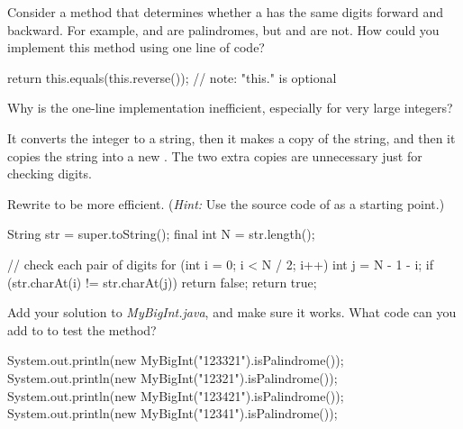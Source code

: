 \Q Consider a method  that determines whether a  has the same digits forward and backward.
For example,  and  are palindromes, but  and  are not.
How could you implement this method using one line of code?

\begin{javalst}
public boolean isPalindrome() {
\end{javalst}

\vspace{-1ex}
\begin{answer}[1em]
\begin{javaans}
    return this.equals(this.reverse());  // note: "this." is optional
\end{javaans}
\end{answer}
\vspace{-1ex}

\begin{javalst}
}
\end{javalst}


\Q Why is the one-line implementation inefficient, especially for very large integers?

\begin{answer}
It converts the integer to a string, then it makes a copy of the string, and then it copies the string into a new .
The two extra copies are unnecessary just for checking digits.
\end{answer}


\Q \label{key3}
Rewrite  to be more efficient.
(\textit{Hint:} Use the source code of  as a starting point.)

\begin{javalst}
public boolean isPalindrome() {
\end{javalst}

\begin{answer}[18em]
\begin{javaans}
    String str = super.toString();
    final int N = str.length();

    // check each pair of digits
    for (int i = 0; i < N / 2; i++) {
        int j = N - 1 - i;
        if (str.charAt(i) != str.charAt(j)) {
            return false;
        }
    }
    return true;
\end{javaans}
\end{answer}

\begin{javalst}
}
\end{javalst}


\Q Add your solution to \textit{MyBigInt.java}, and make sure it works.
What code can you add to  to test the  method?

\begin{answer}[8em]
\begin{javaans}
System.out.println(new MyBigInt("123321").isPalindrome());
System.out.println(new MyBigInt("12321").isPalindrome());
System.out.println(new MyBigInt("123421").isPalindrome());
System.out.println(new MyBigInt("12341").isPalindrome());
\end{javaans}
\end{answer}
